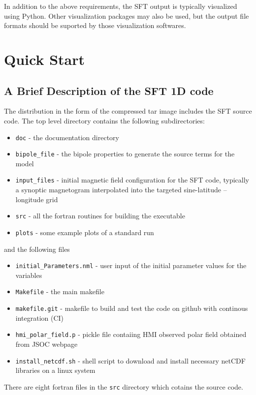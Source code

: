 In addition to the above requirements, the SFT output is typically
visualized using Python. Other visualization packages may also be used, but the output file formats should be suported by those visualization softwares.

\chapter{Quick Start}

\section{A Brief Description of the SFT 1D code}

The distribution in the form of the compressed tar image
includes the SFT source code.
The top level directory contains the following subdirectories:
\begin{itemize}\itemsep=0pt
\item {\tt doc}     - the documentation directory 
\item {\tt bipole\_file} - the bipole properties to generate the source terms for the model
\item {\tt input\_files}  - initial magnetic field configuration for the SFT code, typically a synoptic magnetogram interpolated into the targeted sine-latitude -- longitude grid 
\item {\tt src} - all the fortran routines for building the executable
\item {\tt plots} - some example plots of a standard run
\end{itemize}
and the following files
\begin{itemize}\itemsep=0pt
\item {\tt initial\_Parameters.nml} - user input of the initial parameter values for the variables
\item {\tt Makefile} - the main makefile
\item{\tt makefile.git} - makefile to build and test the code on github with continous integration (CI)
\item {\tt hmi\_polar\_field.p} - pickle file contaiing HMI observed polar field obtained from JSOC webpage
\item{\tt install\_netcdf.sh} - shell script to download and install necessary netCDF libraries on a linux system
\end{itemize}
There are eight fortran files in the \texttt{src} directory which cotains the source code.

